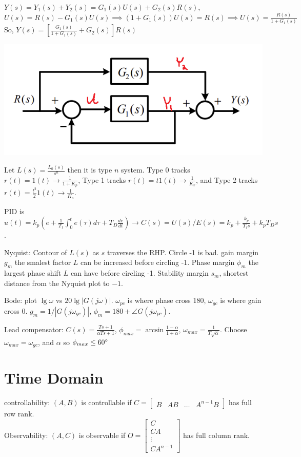 \documentclass[11pt]{article}
\begin{document}
$Y(s) = Y_1(s) + Y_2(s) = G_1(s) U(s) + G_2(s)R(s)$,\\
$U(s) = R(s) - G_1(s)U(s) \implies (1 + G_1(s))U(s) = R(s) \implies U(s) = \frac{R(s)}{1 + G_1(s)}$ \\
So, $Y(s) = \left[\frac{G_1(s)}{1 + G_1(s)} + G_2(s)\right] R(s)$
\begin{center}
    \includegraphics[width=0.99 \linewidth]{transfer.png}
\end{center}

Let $L(s) = \frac{L_0(s)}{s^n}$ then it is type $n$ system. Type 0 tracks $r(t) = 1(t) \to \frac{1}{1 + K_p}$,
Type 1 tracks $r(t) = t1(t) \to \frac{1}{K_v}$, and Type 2 tracks $r(t) = \frac{t^2}{2}1(t) \to \frac{1}{K_a}$.

PID is $u(t) = k_p (e + \frac{1}{T_1}\int_0^t e(\tau) d\tau + T_D \frac{de}{dt}) \to C(s) = U(s)/E(s) = k_p + \frac{k_p}{T_Is} + k_p T_D s$.

Nyquist: Contour of $L(s)$ as $s$ traverses the RHP. Circle -1 is bad.
gain margin $g_m$ the smalest factor $L$ can be increased before circling -1.
Phase margin $\phi_m$ the largest phase shift $L$ can have before circling -1.
Stability margin $s_m$, shortest distance from the Nyquist plot to $-1$.

Bode: plot $\lg \omega$ vs $20 \lg |G(j\omega)|$. $\omega_{pc}$ is where phase cross 180,
$\omega_{gc}$ is where gain cross 0. $g_m = 1/|G(j\omega_{gc})|$, $\phi_m = 180 + \angle G(j\omega_{pc})$.

Lead compensator: $C(s) = \frac{Ts + 1}{\alpha T s + 1}$, $\phi_{max} = \arcsin \frac{1 - \alpha}{1 + \alpha}$, $\omega_{max} = \frac{1}{T\sqrt{\alpha}}$.
Choose $\omega_{max} = \omega_{gc}$, and $\alpha$ so $\phi_{max} \leq 60\degree$

\section{Time Domain}
controllability: $(A,B)$ is controllable if $C = \begin{bmatrix}
    B & AB & \dots & A^{n-1}B
\end{bmatrix}$ has full row rank.\\
Observability: $(A,C)$ is observable if $O = \begin{bmatrix}
    C \\ CA \\ \vdots \\ CA^{n-1}
\end{bmatrix}$ has full column rank.\\
\end{document}
